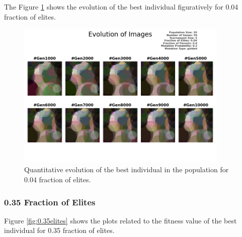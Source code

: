 \documentclass{assignment}
\begin{document}
The Figure \ref{fig:0.04elites_image} shows the evolution of the best individual figuratively for 0.04 fraction of elites.

\begin{figure}[!htb]
    \centering
    \includegraphics[width=0.9\textwidth]{figures/images_output_20_50_5_0.04_0.6_0.2_guided.png}
    \caption{Quantitative evolution of the best individual in the population for 0.04 fraction of elites.}
    \label{fig:0.04elites_image}
\end{figure}

\subsubsection{0.35 Fraction of Elites}

Figure \ref{fig:0.35elites} shows the plots related to the fitness value of the best individual for 0.35 fraction of elites.
\end{document}
